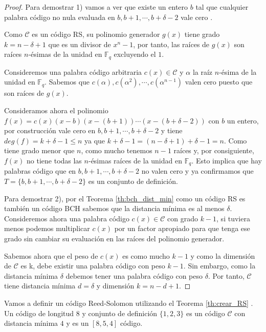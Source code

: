 \begin{proof}
    Para demostrar 1) vamos a ver que existe un entero $b$ tal que cualquier palabra código no nula evaluada en $b,b+1,\cdots,b+\delta-2$ vale cero .
    
    Como $\mathcal{C}$ es un código RS, su polinomio generador $g(x)$ tiene grado $k = n-\delta+1$ que es un divisor de $x^n-1$, por tanto, las raíces de $g(x)$ son raíces $n$-ésimas de la unidad en $\mathbb{F}_q$ excluyendo el $1$. 

    Consideremos una palabra código arbitraria $c(x) \in \mathcal{C}$ y $\alpha$ la raíz $n$-ésima de la unidad en $\mathbb{F}_q$. Sabemos que $c(\alpha),c(\alpha^2),\cdots,c(\alpha^{n-1})$ valen cero puesto que son raíces de $g(x)$.
    
    Consideramos ahora el polinomio $f(x) = c(x)(x-b)(x-(b+1))\cdots(x-(b+\delta-2))$ con $b$ un entero, por construcción vale cero en $b,b+1,\cdots,b+\delta-2$ y tiene $deg(f) = k+\delta-1 \leq n$ ya que $k+\delta-1 = (n-\delta+1) + \delta-1 = n$. Como tiene grado menor que $n$, como mucho tenemos $n-1$ raíces y, por consiguiente, $f(x)$ no tiene todas las $n$-ésimas raíces de la unidad en $\mathbb{F}_q$. Esto implica que hay palabras código que en $b,b+1,\cdots,b+\delta-2$ no valen cero y ya confirmamos que $T = \{ b,b+1,\cdots,b+\delta-2 \}$ es un conjunto de definición.

    Para demostrar 2), por el Teorema \ref{th:bch_dist_min} como un código RS es también un código BCH sabemos que la distancia mínima es al menos $\delta$. Consideremos ahora una palabra código $c(x) \in \mathcal{C}$ con grado $k-1$, si tuviera menos podemos multiplicar $c(x)$ por un factor apropiado para que tenga ese grado sin cambiar su evaluación en las raíces del polinomio generador.

    Sabemos ahora que el peso de $c(x)$ es como mucho $k-1$ y como la dimensión de $\mathcal{C}$ es k, debe existir una palabra código con peso $k-1$. Sin embargo, como la distancia mínima $\delta$ debemos tener una palabra código con peso $\delta$. Por tanto, $\mathcal{C}$ tiene distancia mínima $d = \delta$ y dimensión $k = n-d+1$.
\end{proof}
\begin{exampleth}
Vamos a definir un código Reed-Solomon utilizando el Teorema \ref{th:crear_RS}
. Un código de longitud $8$ y conjunto de definición $\{1,2,3 \}$ es un código $\mathcal{C}$ con distancia mínima $4$ y es un $[8,5,4]$ código. 
\end{exampleth}

